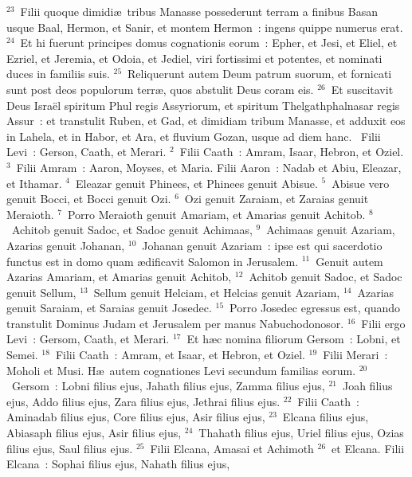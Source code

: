 ${}^{23}$~Filii quoque dimidi\ae\ tribus Manasse possederunt terram a finibus Basan usque Baal, Hermon, et Sanir, et montem Hermon~: ingens quippe numerus erat.
${}^{24}$~Et hi fuerunt principes domus cognationis eorum~: Epher, et Jesi, et Eliel, et Ezriel, et Jeremia, et Odoia, et Jediel, viri fortissimi et potentes, et nominati duces in familiis suis.
${}^{25}$~Reliquerunt autem Deum patrum suorum, et fornicati sunt post deos populorum terr\ae , quos abstulit Deus coram eis.
${}^{26}$~Et suscitavit Deus Isra\"el spiritum Phul regis Assyriorum, et spiritum Thelgathphalnasar regis Assur~: et transtulit Ruben, et Gad, et dimidiam tribum Manasse, et adduxit eos in Lahela, et in Habor, et Ara, et fluvium Gozan, usque ad diem hanc.
~\lettrine[lines=10,image=true,loversize=0.05,lraise=-0.03]{F}{}ilii Levi~: Gerson, Caath, et Merari.
${}^{2}$~Filii Caath~: Amram, Isaar, Hebron, et Oziel.
${}^{3}$~Filii Amram~: Aaron, Moyses, et Maria. Filii Aaron~: Nadab et Abiu, Eleazar, et Ithamar.
${}^{4}$~Eleazar genuit Phinees, et Phinees genuit Abisue.
${}^{5}$~Abisue vero genuit Bocci, et Bocci genuit Ozi.
${}^{6}$~Ozi genuit Zaraiam, et Zaraias genuit Meraioth.
${}^{7}$~Porro Meraioth genuit Amariam, et Amarias genuit Achitob.
${}^{8}$~Achitob genuit Sadoc, et Sadoc genuit Achimaas,
${}^{9}$~Achimaas genuit Azariam, Azarias genuit Johanan,
${}^{10}$~Johanan genuit Azariam~: ipse est qui sacerdotio functus est in domo quam \ae dificavit Salomon in Jerusalem.
${}^{11}$~Genuit autem Azarias Amariam, et Amarias genuit Achitob,
${}^{12}$~Achitob genuit Sadoc, et Sadoc genuit Sellum,
${}^{13}$~Sellum genuit Helciam, et Helcias genuit Azariam,
${}^{14}$~Azarias genuit Saraiam, et Saraias genuit Josedec.
${}^{15}$~Porro Josedec egressus est, quando transtulit Dominus Judam et Jerusalem per manus Nabuchodonosor.
${}^{16}$~Filii ergo Levi~: Gersom, Caath, et Merari.
${}^{17}$~Et h\ae c nomina filiorum Gersom~: Lobni, et Semei.
${}^{18}$~Filii Caath~: Amram, et Isaar, et Hebron, et Oziel.
${}^{19}$~Filii Merari~: Moholi et Musi. H\ae\ autem cognationes Levi secundum familias eorum.
${}^{20}$~Gersom~: Lobni filius ejus, Jahath filius ejus, Zamma filius ejus,
${}^{21}$~Joah filius ejus, Addo filius ejus, Zara filius ejus, Jethrai filius ejus.
${}^{22}$~Filii Caath~: Aminadab filius ejus, Core filius ejus, Asir filius ejus,
${}^{23}$~Elcana filius ejus, Abiasaph filius ejus, Asir filius ejus,
${}^{24}$~Thahath filius ejus, Uriel filius ejus, Ozias filius ejus, Saul filius ejus.
${}^{25}$~Filii Elcana, Amasai et Achimoth
${}^{26}$~et Elcana. Filii Elcana~: Sophai filius ejus, Nahath filius ejus,
